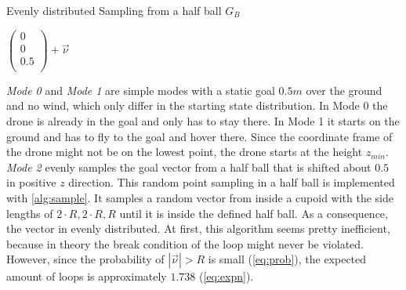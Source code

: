 \newpage
\begin{algorithm}
	\caption{Evenly distributed Sampling from a half ball $G_{B}$}
	\label{alg:sample}
	
	
	\Return $ \left( \begin{array}{c}
		0 \\
		0 \\
		0.5\\
	\end{array}\right) + \overrightarrow{\nu}$
	
\end{algorithm}
\emph{Mode 0} and \emph{Mode 1} are simple modes with a static goal $0.5 m$ over the ground and no wind, which only differ in the starting state distribution. 
In Mode 0 the drone is already in the goal and only has to stay there. 
In Mode 1 it starts on the ground and has to fly to the goal and hover there. 
Since the coordinate frame of the drone might not be on the lowest point, the drone starts at the height $z_{min}$.\\
\emph{Mode 2} evenly samples the goal vector from a half ball that is shifted about $0.5$ in positive $z$ direction. 
This random point sampling in a half ball is implemented with \cref{alg:sample}. 
It samples a random vector from inside a cupoid with the side lengths of $2 \cdot R, 2 \cdot R, R$ 
until it is inside the defined half ball. As a consequence, the vector in evenly distributed. 
At first, this algorithm seems pretty inefficient, because in theory the break condition of the loop might never be violated. 
However, since the probability of $|\overrightarrow{\nu}| > R$ is small (\cref{eq:prob}),
the expected amount of loops is approximately $1.738$ (\cref{eq:expn}).
